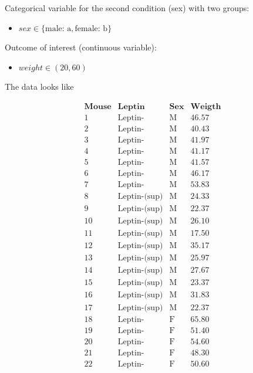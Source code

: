 \documentclass[
]{book}
\providecommand{\tightlist}{%
  \setlength{\itemsep}{0pt}\setlength{\parskip}{0pt}}
\begin{document}
Categorical variable for the second condition (sex) with two groups:

\begin{itemize}
\tightlist
\item
  \(sex \in \{\text{male: a}, \text{female: b}\}\)
\end{itemize}

Outcome of interest (continuous variable):

\begin{itemize}
\tightlist
\item
  \(weight \in (20, 60)\)
\end{itemize}

The data looks like

\[
\begin{array}{cccc}
\mathbf{Mouse} & \mathbf{Leptin} & \mathbf{Sex} & \mathbf{Weigth} \\ 
1&\text{Leptin-}&\text{M}&46.57 \\
2&\text{Leptin-}&\text{M}&40.43 \\
3&\text{Leptin-}&\text{M}&41.97 \\
4&\text{Leptin-}&\text{M}&41.17 \\
5&\text{Leptin-}&\text{M}&41.57 \\
6&\text{Leptin-}&\text{M}&46.17 \\
7&\text{Leptin-}&\text{M}&53.83 \\
8 & \text{Leptin-(sup)}&\text{M}&24.33 \\
9 & \text{Leptin-(sup)}&\text{M}&22.37 \\
10& \text{Leptin-(sup)}&\text{M}&26.10 \\
11& \text{Leptin-(sup)}&\text{M}&17.50 \\
12& \text{Leptin-(sup)}&\text{M}&35.17 \\
13& \text{Leptin-(sup)}&\text{M}&25.97 \\
14& \text{Leptin-(sup)}&\text{M}&27.67 \\
15& \text{Leptin-(sup)}&\text{M}&23.37 \\
16& \text{Leptin-(sup)}&\text{M}&31.83 \\
17& \text{Leptin-(sup)}&\text{M}&22.37 \\
18&\text{Leptin-}&\text{F}&  65.80 \\
19&\text{Leptin-}&\text{F}&  51.40 \\
20&\text{Leptin-}&\text{F}&  54.60 \\
21&\text{Leptin-}&\text{F}&  48.30 \\
22&\text{Leptin-}&\text{F}&  50.60 \\

\end{array}\]
\end{document}
